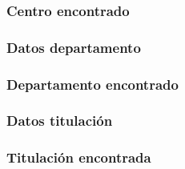   

  \subsubsection{Centro encontrado}

  

  \subsubsection{Datos departamento}

  

  \subsubsection{Departamento encontrado}

  

  \subsubsection{Datos titulación}

  

  \subsubsection{Titulación encontrada}

  